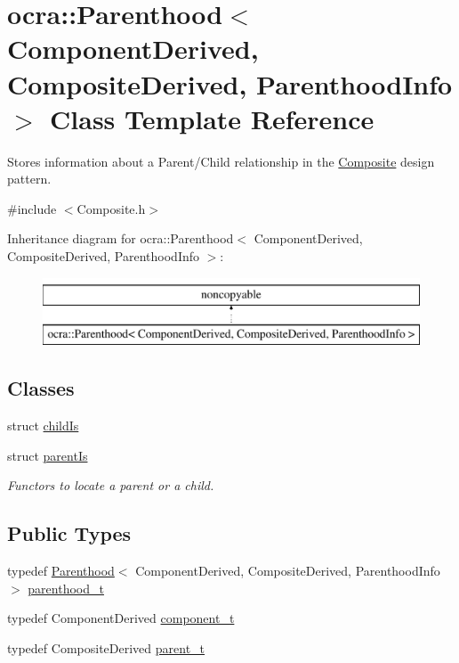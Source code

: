 \hypertarget{classocra_1_1Parenthood}{}\section{ocra\+:\+:Parenthood$<$ Component\+Derived, Composite\+Derived, Parenthood\+Info $>$ Class Template Reference}
\label{classocra_1_1Parenthood}


Stores information about a Parent/\+Child relationship in the \hyperlink{classocra_1_1Composite}{Composite} design pattern.  




{\ttfamily \#include $<$Composite.\+h$>$}

Inheritance diagram for ocra\+:\+:Parenthood$<$ Component\+Derived, Composite\+Derived, Parenthood\+Info $>$\+:\begin{figure}[H]
\begin{center}
\leavevmode
\includegraphics[height=2.000000cm]{db/d6f/classocra_1_1Parenthood}
\end{center}
\end{figure}
\subsection*{Classes}
\begin{DoxyCompactItemize}
\item 
struct \hyperlink{structocra_1_1Parenthood_1_1childIs}{child\+Is}
\item 
struct \hyperlink{structocra_1_1Parenthood_1_1parentIs}{parent\+Is}
\begin{DoxyCompactList}\small\item\em Functors to locate a parent or a child. \end{DoxyCompactList}\end{DoxyCompactItemize}
\subsection*{Public Types}
\begin{DoxyCompactItemize}
\item 
typedef \hyperlink{classocra_1_1Parenthood}{Parenthood}$<$ Component\+Derived, Composite\+Derived, Parenthood\+Info $>$ \hyperlink{classocra_1_1Parenthood_acdae20cb747190b5dc9dbe42290bde78}{parenthood\+\_\+t}
\item 
typedef Component\+Derived \hyperlink{classocra_1_1Parenthood_a44b601577125fe0fd1d1e5ae4f143349}{component\+\_\+t}
\item 
typedef Composite\+Derived \hyperlink{classocra_1_1Parenthood_a2f95265c57cf96bbc26afee2ac757dd6}{parent\+\_\+t}
\end{DoxyCompactItemize}
